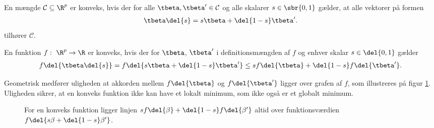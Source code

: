 \begin{defn} \label{defn:konveksm}
En mængde \(\mathcal{C} \subseteq \R^p\) er konveks, hvis der for alle \(\tbeta, \tbeta' \in \mathcal{C}\) og alle skalarer \(s \in \sbr{0,1}\) gælder, at alle vektorer på formen
\begin{align*}
\tbeta \del{s} = s \tbeta + \del{1-s} \tbeta'.
\end{align*}
tilhører \(\mathcal{C}\).
\end{defn}

\begin{defn} \label{defn:konveksfkt}
En funktion \(f: \ \R^p \rightarrow \R\) er konveks, hvis der for \(\tbeta\), \(\tbeta'\) i definitionsmængden af \(f\) og enhver skalar \(s \in \del{0,1}\) gælder
\begin{align*}
f \del{\tbeta \del{s}} = f \del{s \tbeta + \del{1-s} \tbeta'} \leq s f\del{\tbeta} + \del{1-s} f\del{\tbeta'}.
\end{align*}
\end{defn}
Geometrisk medfører uligheden at akkorden mellem \(f \del{\tbeta}\) og  \(f \del{\tbeta'}\) ligger over grafen af \(f\), som illustreres på figur \ref{fig:konveks}.
Uligheden sikrer, at en konveks funktion ikke kan have et lokalt minimum, som ikke også er et globalt minimum.
%
\begin{figure}[H]
\centering
\scalebox{1.2}{}
\caption{For en konveks funktion ligger linjen \(s f \del{\beta} + \del{1-s} f \del{\beta'}\) altid over funktionsværdien \(f \del{s \beta + \del{1-s} \beta'}\).} \label{fig:konveks}
\end{figure}



